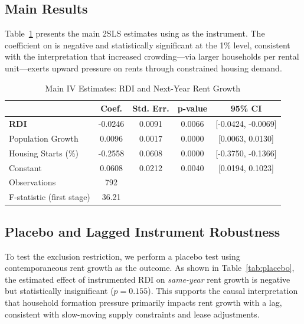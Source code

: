 \documentclass[APA,Times1COL]{WileyNJDv5} %
\begin{document}
\vspace{0.5em}
\subsection{Main Results}

Table~\ref{tab:main-iv} presents the main 2SLS estimates using  as the instrument. The coefficient on  is negative and statistically significant at the 1\% level, consistent with the interpretation that increased crowding—via larger households per rental unit—exerts upward pressure on rents through constrained housing demand.

\begin{table}[hbt!]
	\centering
	\caption{Main IV Estimates: RDI and Next-Year Rent Growth}
	\label{tab:main-iv}
	\begin{tabular}{lcccc}
		\toprule
		& Coef. & Std. Err. & p-value & 95\% CI \\
		\midrule
		\textbf{RDI} & -0.0246 & 0.0091 & 0.0066 & [-0.0424, -0.0069] \\
		Population Growth & 0.0096 & 0.0017 & 0.0000 & [0.0063, 0.0130] \\
		Housing Starts (\%) & -0.2558 & 0.0608 & 0.0000 & [-0.3750, -0.1366] \\
		Constant & 0.0608 & 0.0212 & 0.0040 & [0.0194, 0.1023] \\
		\midrule
		Observations & 792 &  &  &  \\
		F-statistic (first stage) & 36.21 & & & \\
		\bottomrule
	\end{tabular}
\end{table}

\subsection{Placebo and Lagged Instrument Robustness}

To test the exclusion restriction, we perform a placebo test using contemporaneous rent growth as the outcome. As shown in Table~\ref{tab:placebo}, the estimated effect of instrumented RDI on \emph{same-year} rent growth is negative but statistically insignificant ($p = 0.155$). This supports the causal interpretation that household formation pressure primarily impacts rent growth with a lag, consistent with slow-moving supply constraints and lease adjustments.
\end{document}
